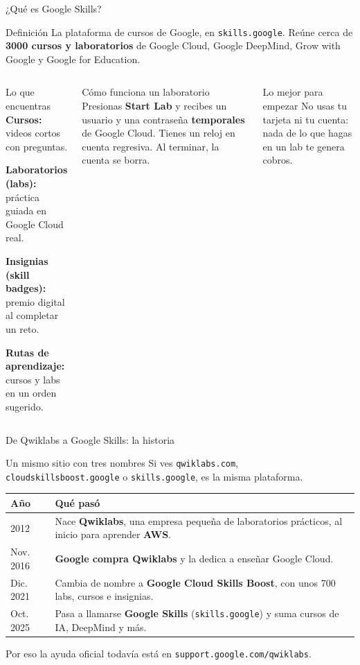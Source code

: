 \documentclass[aspectratio=169,10pt,c]{beamer}
\begin{document}
\begin{frame}{¿Qué es Google Skills?}
\begin{block}{Definición}
\small La plataforma de cursos de Google, en \texttt{skills.google}. Reúne cerca de \textbf{3000 cursos y laboratorios} de Google Cloud, Google DeepMind, Grow with Google y Google for Education.
\end{block}
\begin{columns}[T,onlytextwidth]
\begin{exampleblock}{Lo que encuentras}
\small
\textbf{Cursos:} videos cortos con preguntas.\par\smallskip
\textbf{Laboratorios (labs):} práctica guiada en Google Cloud real.\par\smallskip
\textbf{Insignias (skill badges):} premio digital al completar un reto.\par\smallskip
\textbf{Rutas de aprendizaje:} cursos y labs en un orden sugerido.
\end{exampleblock}
\begin{block}{Cómo funciona un laboratorio}
\small Presionas \textbf{Start Lab} y recibes un usuario y una contraseña \textbf{temporales} de Google Cloud. Tienes un reloj en cuenta regresiva. Al terminar, la cuenta se borra.
\end{block}
\begin{alertblock}{Lo mejor para empezar}
\small No usas tu tarjeta ni tu cuenta: nada de lo que hagas en un lab te genera cobros.
\end{alertblock}
\end{columns}
\end{frame}

\begin{frame}{De Qwiklabs a Google Skills: la historia}
\begin{block}{Un mismo sitio con tres nombres}
\small Si ves \texttt{qwiklabs.com}, \texttt{cloudskillsboost.google} o \texttt{skills.google}, es la misma plataforma.
\end{block}
\renewcommand{\arraystretch}{1.3}
\centering\small
\begin{tabular}{@{}p{2.3cm}p{10.6cm}@{}}
\toprule
\textbf{Año} & \textbf{Qué pasó}\\
\midrule
2012 & Nace \textbf{Qwiklabs}, una empresa pequeña de laboratorios prácticos, al inicio para aprender \textbf{AWS}.\\
Nov. 2016 & \textbf{Google compra Qwiklabs} y la dedica a enseñar Google Cloud.\\
Dic. 2021 & Cambia de nombre a \textbf{Google Cloud Skills Boost}, con unos 700 labs, cursos e insignias.\\
Oct. 2025 & Pasa a llamarse \textbf{Google Skills} (\texttt{skills.google}) y suma cursos de IA, DeepMind y más.\\
\bottomrule
\end{tabular}
\par\vspace{2mm}
\footnotesize Por eso la ayuda oficial todavía está en \texttt{support.google.com/qwiklabs}.
\end{frame}
\end{document}
